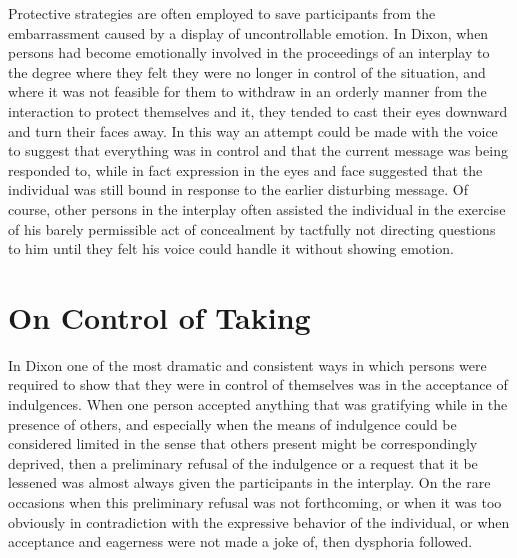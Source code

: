 \documentclass[twoside,symmetric,nobib,justified]{tufte-book}
\begin{document}
Protective strategies are often employed to save participants from the
embarrassment caused by a display of uncontrollable emotion. In Dixon,
when persons had become emotionally involved in the proceedings of an
interplay to the degree where they felt they were no longer in control
of the situation, and where it was not feasible for them to withdraw in
an orderly manner from the interaction to protect themselves and it,
they tended to cast their eyes downward and turn their faces away. In
this way an attempt could be made with the voice to suggest that
everything was in control and that the current message was being
responded to, while in fact expression in the eyes and face suggested
that the individual was still bound in response to the earlier
disturbing message. Of course, other persons in the interplay often
assisted the individual in the exercise of his barely permissible act of
concealment by tactfully not directing questions to him until they felt
his voice could handle it without showing emotion.

\hypertarget{on-control-of-taking}{%
\section{On Control of Taking}\label{on-control-of-taking}}

In Dixon one of the most dramatic and consistent ways in which persons
were required to show that they were in control of themselves was in the
acceptance of indulgences. When one person accepted anything that was
gratifying while in the presence of others, and especially when the
means of indulgence could be considered limited in the sense that others
present might be correspondingly deprived, then a preliminary refusal of
the indulgence or a request that it be lessened was almost always given
the participants in the interplay. On the rare occasions when this
preliminary refusal was not forthcoming, or when it was too obviously in
contradiction with the expressive behavior of the individual, or when
acceptance and eagerness were not made a joke of, then dysphoria
followed.
\end{document}

